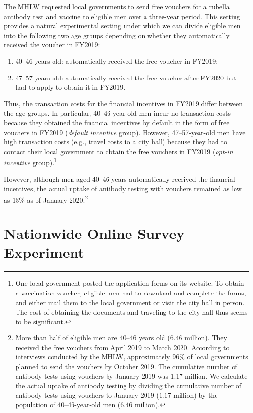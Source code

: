 \documentclass[
      12pt,
    a4paper
]{article}
\providecommand{\tightlist}{%
  \setlength{\itemsep}{0pt}\setlength{\parskip}{0pt}}
\begin{document}
The MHLW requested local governments to send free vouchers for a rubella antibody test and vaccine to eligible men over a three-year period. This setting provides a natural experimental setting under which we can divide eligible men into the following two age groups depending on whether they automatically received the voucher in FY2019:

\begin{enumerate}
\def\labelenumi{\arabic{enumi}.}
\tightlist
\item
  40--46 years old: automatically received the free voucher in FY2019;
\item
  47--57 years old: automatically received the free voucher after FY2020 but had to apply to obtain it in FY2019.
\end{enumerate}

Thus, the transaction costs for the financial incentives in FY2019 differ between the age groups. In particular, 40--46-year-old men incur no transaction costs because they obtained the financial incentives by default in the form of free vouchers in FY2019 (\emph{default incentive} group). However, 47--57-year-old men have high transaction costs (e.g., travel costs to a city hall) because they had to contact their local government to obtain the free vouchers in FY2019 (\emph{opt-in incentive} group).\footnote{One local government posted the application forms on its website. To obtain a vaccination voucher, eligible men had to download and complete the forms, and either mail them to the local government or visit the city hall in person. The cost of obtaining the documents and traveling to the city hall thus seems to be significant.}

However, although men aged 40--46 years automatically received the financial incentives, the actual uptake of antibody testing with vouchers remained as low as 18\% as of January 2020.\footnote{More than half of eligible men are 40--46 years old (\(6.46\) million). They received the free vouchers from April 2019 to March 2020. According to interviews conducted by the MHLW, approximately 96\% of local governments planned to send the vouchers by October 2019. The cumulative number of antibody tests using vouchers by January 2019 was 1.17 million. We calculate the actual uptake of antibody testing by dividing the cumulative number of antibody tests using vouchers to January 2019 (\(1.17\) million) by the population of 40--46-year-old men (\(6.46\) million).}

\hypertarget{experiment}{%
\section{Nationwide Online Survey Experiment}\label{experiment}}
\end{document}
